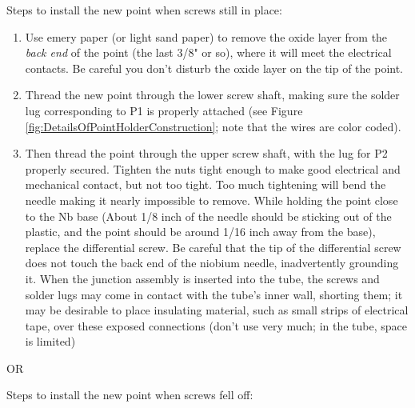 \documentclass{../lab}
\begin{document}
\noindent Steps to install the new point when screws still in place:

\begin{enumerate}
    \item Use emery paper (or light sand paper) to remove the oxide layer from the \emph{back end }of the point (the last 3/8" or so), where it will meet the electrical contacts. Be careful you don't disturb the oxide layer on the tip of the point.

    \item Thread the new point through the lower screw shaft, making sure the solder lug corresponding to P1 is properly attached (see Figure \ref{fig:DetailsOfPointHolderConstruction}; note that the wires are color coded).

    \item Then thread the point through the upper screw shaft, with the lug for P2 properly secured. Tighten the nuts tight enough to make good electrical and mechanical contact, but not too tight. Too much tightening will bend the needle making it nearly impossible to remove. While holding the point close to the Nb base (About 1/8 inch of the needle should be sticking out of the plastic, and the point should be around 1/16 inch away from the base), replace the differential screw. Be careful that the tip of the differential screw does not touch the back end of the niobium needle, inadvertently grounding it. When the junction assembly is inserted into the tube, the screws and solder lugs may come in contact with the tube's inner wall, shorting them; it may be desirable to place insulating material, such as small strips of electrical tape, over these exposed connections (don't use very much; in the tube, space is limited)

\end{enumerate}

\noindent OR

\noindent Steps to install the new point when screws fell off:
\end{document}

